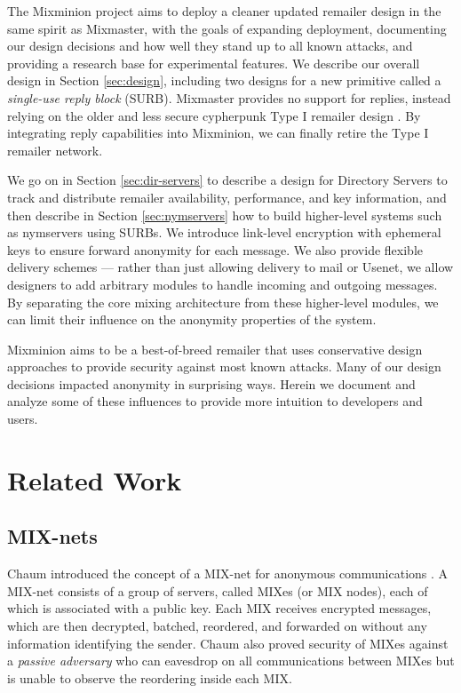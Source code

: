 \documentclass{llncs}
\begin{document}
The Mixminion project aims to deploy a cleaner updated remailer design
in the same spirit as Mixmaster, with the goals of expanding deployment,
documenting our design decisions and how well they stand up to all known
attacks, and providing a research base for experimental features. We
describe our overall design in Section \ref{sec:design}, including two
designs for a new primitive called a \emph{single-use reply block}
(SURB).  Mixmaster provides no support for replies, instead relying
on the older and less secure cypherpunk Type I remailer design
\cite{remailer-history}. By integrating reply capabilities into
Mixminion, we can finally retire the Type I remailer network.

We go on in Section \ref{sec:dir-servers} to describe a design for
Directory Servers to track and distribute remailer availability,
performance, and key information, and then describe in Section
\ref{sec:nymservers} how to build higher-level systems such as nymservers
using SURBs. We introduce link-level encryption with ephemeral keys to
ensure forward anonymity for each message. We also provide flexible
delivery schemes --- rather than just allowing delivery to mail or
Usenet, we allow designers to add arbitrary modules to handle incoming
and outgoing messages. 
By separating the core mixing architecture from these
higher-level modules, we can limit their influence on the anonymity
properties of the system.

Mixminion aims to be a best-of-breed remailer that uses conservative
design approaches to provide security against most known attacks.
Many of our design decisions impacted anonymity in surprising ways. Herein
we document and analyze some of these influences to provide more intuition
to developers and users.


\section{Related Work}

\subsection{MIX-nets}

Chaum introduced the concept of a MIX-net for anonymous communications
\cite{chaum-mix}. A MIX-net consists of a group of servers, called MIXes
(or MIX nodes), each of which is associated with a public key. Each
MIX receives encrypted messages, which are then decrypted, batched,
reordered, and forwarded on without any information identifying the
sender. Chaum also proved security of MIXes against a \emph{passive
adversary} who can eavesdrop on all communications between MIXes but is
unable to observe the reordering inside each MIX.
\end{document}
